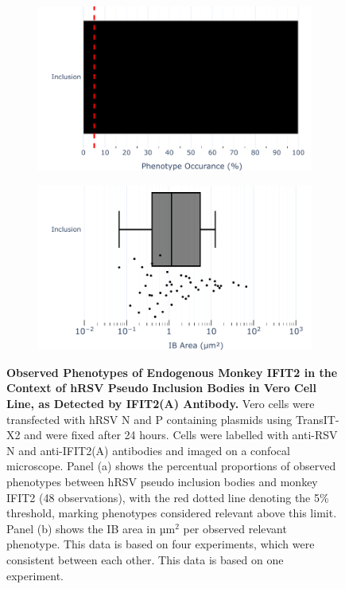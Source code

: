 \begin{figure}
    \begin{subfigure}{0.495\textwidth}
        \caption{}
        \includegraphics[width=1\linewidth]{09. Chapter 4/Figs/01. pIB/03. IFIT2/02. IFIT2A/04. bar_i2a_vero_hnhp.pdf} 
    \end{subfigure}
    \begin{subfigure}{0.495\textwidth}
        \caption{}
        \includegraphics[width=1\linewidth]{09. Chapter 4/Figs/01. pIB/03. IFIT2/02. IFIT2A/05. box_i2a_vero_hnhp.pdf}
    \end{subfigure}
    \caption[Observed Phenotypes of Endogenous Monkey IFIT2 in the Context of hRSV Pseudo Inclusion Bodies in Vero Cell Line, as Detected by IFIT2(A) Antibody.]{\textbf{Observed Phenotypes of Endogenous Monkey IFIT2 in the Context of hRSV Pseudo Inclusion Bodies in Vero Cell Line, as Detected by IFIT2(A) Antibody.} Vero cells were transfected with hRSV N and P containing plasmids using TransIT-X2 and were fixed after 24 hours. Cells were labelled with anti-RSV N and anti-IFIT2(A) antibodies and imaged on a confocal microscope. Panel (a) shows the percentual proportions of observed phenotypes between hRSV pseudo inclusion bodies and monkey IFIT2 (48 observations), with the red dotted line denoting the 5\% threshold, marking phenotypes considered relevant above this limit. Panel (b) shows the IB area in \(\mbox{µm}^2\) per observed relevant phenotype. This data is based on four experiments, which were consistent between each other.
This data is based on one experiment.}
    \label{fig:Observed Phenotypes of Endogenous Monkey IFIT2 in the Context of hRSV Pseudo Inclusion Bodies in Vero Cell Line, as Detected by IFIT2(A) Antibody}
\end{figure}

